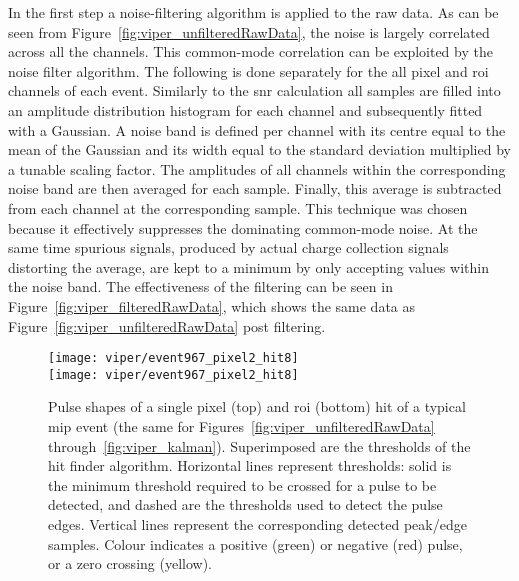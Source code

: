 In the first step a noise-filtering algorithm is applied to the raw data.
As can be seen from Figure~\ref{fig:viper_unfilteredRawData}, the noise is largely correlated across all the channels.
This common-mode correlation can be exploited by the noise filter algorithm.
The following is done separately for the all pixel and \gls{roi} channels of each event.
Similarly to the \gls{snr} calculation all samples are filled into an amplitude distribution histogram for each channel and subsequently fitted with a Gaussian.
A noise band is defined per channel with its centre equal to the mean of the Gaussian and its width equal to the standard deviation multiplied by a tunable scaling factor.
The amplitudes of all channels within the corresponding noise band are then averaged for each sample.
Finally, this average is subtracted from each channel at the corresponding sample.
This technique was chosen because it effectively suppresses the dominating common-mode noise.
At the same time spurious signals, produced by actual charge collection signals distorting the average, are kept to a minimum by only accepting values within the noise band.
The effectiveness of the filtering can be seen in Figure~\ref{fig:viper_filteredRawData}, which shows the same data as Figure~\ref{fig:viper_unfilteredRawData} post filtering.

\begin{figure}[tbp]
	\centering
	\texttt{[image: viper/event967\_pixel2\_hit8]}\\
	\texttt{[image: viper/event967\_pixel2\_hit8]}
	\caption[Pulse shapes of typical pixel demonstrator event]{%
		Pulse shapes of a single pixel (top) and \acrshort{roi} (bottom) hit of a typical \acrshort{mip} event (the same for Figures~\ref{fig:viper_unfilteredRawData} through~\ref{fig:viper_kalman}).
		Superimposed are the thresholds of the hit finder algorithm. Horizontal lines represent thresholds: solid is the minimum threshold required to be crossed for a pulse to be detected, and dashed are the thresholds used to detect the pulse edges.
		Vertical lines represent the corresponding detected peak/edge samples.
		Colour indicates a positive (green) or negative (red) pulse, or a zero crossing (yellow).
	}
	\label{fig:viper_hitFinder}
\end{figure}

